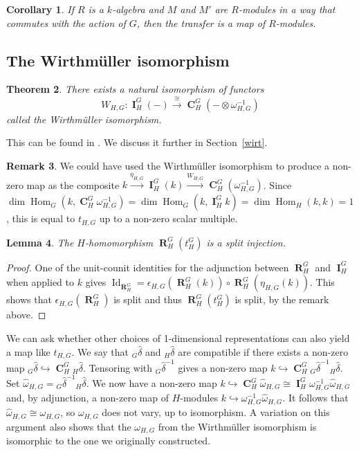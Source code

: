 \documentclass[12pt]{amsart}
\newtheorem{theorem}{Theorem}[subsection]
\newtheorem{lemma}[theorem]{Lemma}
\newtheorem{corollary}[theorem]{Corollary}
\theoremstyle{definition}
\newtheorem{remark}[theorem]{Remark}
\DeclareMathOperator{\ind}{\mathbf{I}}
\DeclareMathOperator{\coind}{\mathbf{C}}
\DeclareMathOperator{\res}{\mathbf{R}}
\DeclareMathOperator{\Hom}{Hom}
\DeclareMathOperator{\ide}{Id}
\begin{document}
\begin{corollary} 
If $R$ is a $k$-algebra and $M$ and $M'$ are $R$-modules in a way that commutes with the action of $G$, then the transfer is a map of $R$-modules.
\end{corollary}

\subsection{The Wirthm\"uller isomorphism}\label{sec:wirth}


\begin{theorem}\label{th:wirth} 
	There exists a natural isomorphism of functors
	\[
	W_{H,G} \colon  \ind_H^G(-)\overset{\cong}{\longrightarrow}\coind_H^G(-\otimes\omega_{H,G}^{-1})
	\]
	called the {\em Wirthm\"uller isomorphism}.
\end{theorem}

This can be found in \cite[I.8.17]{MR2015057}.  We discuss it further in Section~\ref{wirt}.


\begin{remark}
	We could have used the Wirthm\"uller isomorphism to produce a non-zero map as the composite $k \xrightarrow{\eta_{H,G}} \ind ^G_H (k) \xrightarrow{W_{H,G}} \coind ^G_H (\omega^{-1}_{H,G})$. Since $\dim \Hom_G(k,\coind ^G_H \omega^{-1}_{H,G}) = \dim \Hom_G(k, \ind ^G_H k) = \dim \Hom_H(k,k)=1$, this is equal to $t_{H,G}$ up to a non-zero scalar multiple. 
\end{remark}

\begin{lemma}\label{l:P1}
	The $H$-homomorphism $\res ^G_H (t^G_H)$ is a split injection.
\end{lemma}

\begin{proof}
One of the unit-counit identities for the adjunction between $\res^G_H$ and $\ind^G_H$ when applied to $k$ gives $\ide_{\res^G_H}=\epsilon_{H,G}(\res^G_H(k)) \circ \res^G_H(\eta_{H,G}(k))$. This shows that $\epsilon_{H,G}(\res^G_H)$ is split and thus $\res ^G_H (t^G_H)$ is split, by the remark above.
\end{proof}

We can ask whether other choices of 1-dimensional representations can also yield a map like $t_{H,G}$. We say that ${}_G \hat{\delta}$ and ${}_H \hat{\delta}$ are compatible if there exists a non-zero map ${}_G \hat{\delta} \hookrightarrow \coind^G_H {}_H \hat{\delta}$. Tensoring with ${}_G \hat{\delta}^{-1}$ gives a non-zero map $ k \hookrightarrow \coind^G_H {}_G \hat{\delta}^{-1} {}_H \hat{\delta}$. Set $\hat{\omega}_{H,G} = {}_G \hat{\delta}^{-1}{}_H \hat{\delta}$. We now have a non-zero map $k \hookrightarrow \coind^G_H \hat{\omega}_{H,G} \cong  \ind^G_H \omega^{-1}_{H,G} \hat{\omega}_{H,G}$ and, by adjunction, a non-zero map of $H$-modules $k \hookrightarrow   \omega^{-1}_{H,G} \hat{\omega}_{H,G}$. It follows that $\hat{\omega}_{H,G} \cong \omega_{H,G}$, so $\omega_{H,G}$ does not vary, up to isomorphism. A variation on this argument also shows that the $\omega_{H,G}$ from the Wirthm\"uller isomorphism is isomorphic to the one we originally constructed.
\end{document}
